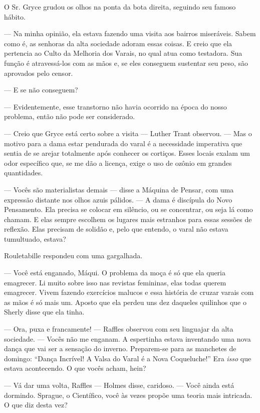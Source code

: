 O Sr. Gryce grudou os olhos na ponta da bota direita, seguindo seu
famoso hábito.

--- Na minha opinião, ela estava fazendo uma visita aos bairros
miseráveis. Sabem como é, as senhoras da alta sociedade adoram essas
coisas. E creio que ela pertencia ao Culto da Melhoria dos Varais, no
qual atua como testadora. Sua função é atravessá-los com as mãos e, se
eles conseguem sustentar seu peso, são aprovados pelo censor.

--- E se não conseguem?

--- Evidentemente, esse transtorno não havia ocorrido na época do nosso
problema, então não pode ser considerado.

--- Creio que Gryce está certo sobre a visita --- Luther Trant observou.
--- Mas o motivo para a dama estar pendurada do varal é a necessidade
imperativa que sentia de se arejar totalmente após conhecer os cortiços.
Esses locais exalam um odor específico que, se me dão a licença, exige o
uso de ozônio em grandes quantidades.

--- Vocês são materialistas demais --- disse a Máquina de Pensar, com
uma expressão distante nos olhos azuis pálidos. --- A dama é discípula
do Novo Pensamento. Ela precisa se colocar em silêncio, ou se
concentrar, ou seja lá como chamam. E elas sempre escolhem os lugares
mais estranhos para essas sessões de reflexão. Elas precisam de solidão
e, pelo que entendo, o varal não estava tumultuado, estava?

Rouletabille respondeu com uma gargalhada.

--- Você está enganado, Máqui. O problema da moça é só que ela queria
emagrecer. Li muito sobre isso nas revistas femininas, elas todas querem
emagrecer. Vivem fazendo exercícios malucos e essa história de cruzar
varais com as mãos é só mais um. Aposto que ela perdeu uns dez daqueles
quilinhos que o Sherly disse que ela tinha.

--- Ora, puxa e francamente! --- Raffles observou com seu linguajar da
alta sociedade. --- Vocês não me enganam. A espertinha estava inventando
uma nova dança que vai ser a sensação do inverno. Preparem-se para as
manchetes de domingo: ``Dança Incrível! A Valsa do Varal é a Nova
Coqueluche!'' Era \emph{isso} que estava acontecendo. O que vocês acham,
hein?

--- Vá dar uma volta, Raffles --- Holmes disse, caridoso. --- Você ainda
está dormindo. Sprague, o Científico, você às vezes propõe uma teoria
mais intricada. O que diz desta vez?

